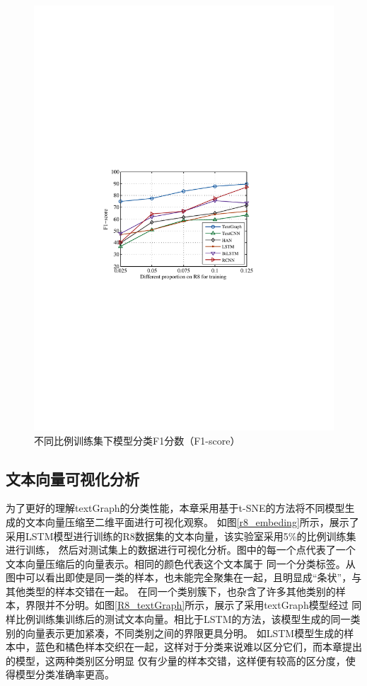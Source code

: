 \begin{figure}[htb]
\begin{minipage}[t]{0.5\linewidth}
    \includegraphics[width=1\textwidth]{pic/R8_f1-score.pdf}
    \caption{不同比例训练集下模型分类F1分数（F1-score）}
    \label{R8_f1-score}
    \end{minipage}
\end{figure}

\subsection{文本向量可视化分析}
为了更好的理解textGraph的分类性能，本章采用基于t-SNE的方法将不同模型生成的文本向量压缩至二维平面进行可视化观察。
如图\ref{r8_embeding}所示，展示了采用LSTM模型进行训练的R8数据集的文本向量，该实验室采用5\%的比例训练集进行训练，
然后对测试集上的数据进行可视化分析。图中的每一个点代表了一个文本向量压缩后的向量表示。相同的颜色代表这个文本属于
同一个分类标签。从图中可以看出即使是同一类的样本，也未能完全聚集在一起，且明显成“条状”，与其他类型的样本交错在一起。
在同一个类别簇下，也杂含了许多其他类别的样本，界限并不分明。如图\ref{R8_textGraph}所示，展示了采用textGraph模型经过
同样比例训练集训练后的测试文本向量。相比于LSTM的方法，该模型生成的同一类别的向量表示更加紧凑，不同类别之间的界限更具分明。
如LSTM模型生成的样本中，蓝色和橘色样本交织在一起，这样对于分类来说难以区分它们，而本章提出的模型，这两种类别区分明显
仅有少量的样本交错，这样便有较高的区分度，使得模型分类准确率更高。

